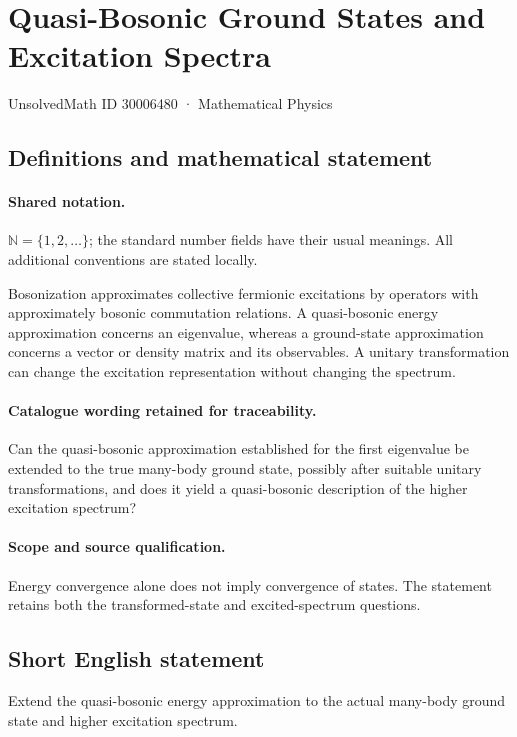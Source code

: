 \documentclass[11pt]{article}
\begin{document}
\setcounter{section}{30006479}
\section{Quasi-Bosonic Ground States and Excitation Spectra}\label{30006480}
{\small UnsolvedMath ID 30006480 · Mathematical Physics}
\subsection{Definitions and mathematical statement}

\paragraph{Shared notation.}$\mathbb N=\{1,2,\ldots\}$; the standard number fields have their usual meanings. All additional conventions are stated locally.


Bosonization approximates collective fermionic excitations by operators with approximately bosonic commutation relations. A quasi-bosonic energy approximation concerns an eigenvalue, whereas a ground-state approximation concerns a vector or density matrix and its observables. A unitary transformation can change the excitation representation without changing the spectrum.

\paragraph{Catalogue wording retained for traceability.}
Can the quasi-bosonic approximation established for the first eigenvalue be extended to the true many-body ground state, possibly after suitable unitary transformations, and does it yield a quasi-bosonic description of the higher excitation spectrum?

\paragraph{Scope and source qualification.}Energy convergence alone does not imply convergence of states. The statement retains both the transformed-state and excited-spectrum questions.
\subsection{Short English statement}
Extend the quasi-bosonic energy approximation to the actual many-body ground state and higher excitation spectrum.
\end{document}
